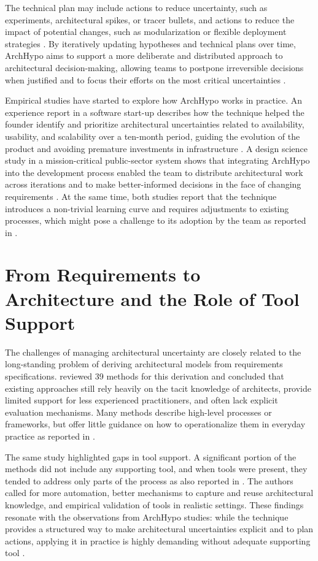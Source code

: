 The technical plan may include actions to reduce uncertainty, such as experiments, architectural spikes, or tracer bullets, and actions to reduce the impact of potential changes, such as modularization or flexible deployment strategies \citep{silva2024tse}. 
By iteratively updating hypotheses and technical plans over time, ArchHypo aims to support a more deliberate and distributed approach to architectural decision-making, allowing teams to postpone irreversible decisions when justified and to focus their efforts on the most critical uncertainties \citep{silva2024tse,silva2024ieeesw}.

Empirical studies have started to explore how ArchHypo works in practice. An experience report in a software start-up describes how the technique helped the founder identify and prioritize architectural uncertainties related to availability, usability, and scalability over a ten-month period, guiding the evolution of the product and avoiding premature investments in infrastructure \citep{silva2024ieeesw}. 
A design science study in a mission-critical public-sector system shows that integrating ArchHypo into the development process enabled the team to distribute architectural work across iterations and to make better-informed decisions in the face of changing requirements \citep{silva2024tse}. 
At the same time, both studies report that the technique introduces a non-trivial learning curve and requires adjustments to existing processes, which might pose a challenge to its adoption by the team as reported in \citet{silva2024tse,silva2024ieeesw}.

\section{From Requirements to Architecture and the Role of Tool Support}

The challenges of managing architectural uncertainty are closely related to the long-standing problem of deriving architectural models from requirements specifications. 
\citet{souza2019} reviewed 39 methods for this derivation and concluded that existing approaches still rely heavily on the tacit knowledge of architects, provide limited support for less experienced practitioners, and often lack explicit evaluation mechanisms. 
Many methods describe high-level processes or frameworks, but offer little guidance on how to operationalize them in everyday practice as reported in \citet{souza2019}.

The same study highlighted gaps in tool support. A significant portion of the methods did not include any supporting tool, and when tools were present, they tended to address only parts of the process as also reported in \citet{souza2019}. 
The authors called for more automation, better mechanisms to capture and reuse architectural knowledge, and empirical validation of tools in realistic settings. 
These findings resonate with the observations from ArchHypo studies: while the technique provides a structured way to make architectural uncertainties explicit and to plan actions, applying it in practice is highly demanding without adequate supporting tool \citep{silva2024tse,silva2024ieeesw}.

